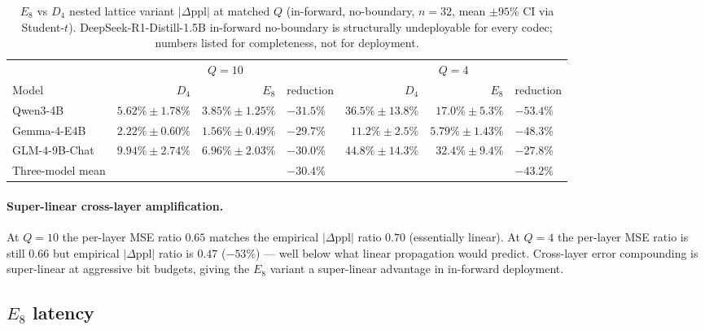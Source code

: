 \documentclass[10pt,a4paper]{article}
\theoremstyle{definition}
\theoremstyle{plain}
\newcommand{\abs}[1]{\left\lvert#1\right\rvert}
\begin{document}
\begin{table}[H]
\centering
\small
\caption{$E_8$ vs $D_4$ nested lattice variant $\abs{\Delta\mathrm{ppl}}$ at matched $Q$ (in-forward,
no-boundary, $n=32$, mean $\pm 95\%$ CI via Student-$t$). DeepSeek-R1-Distill-1.5B
in-forward no-boundary is structurally undeployable for every
codec; numbers listed for completeness, not for deployment.}
\label{tab:v15-dppl}
\begin{tabular}{lrrlrrl}
  \toprule
   & \multicolumn{3}{c}{$Q = 10$} & \multicolumn{3}{c}{$Q = 4$} \\
  \cmidrule(lr){2-4}\cmidrule(lr){5-7}
  Model & $D_4$ & $E_8$ & reduction & $D_4$ & $E_8$ & reduction \\
  \midrule
  Qwen3-4B      & $5.62\%\pm1.78\%$  & $\mathbf{3.85\%\pm1.25\%}$  & $\mathbf{-31.5\%}$ & $36.5\%\pm 13.8\%$  & $\mathbf{17.0\%\pm 5.3\%}$  & $\mathbf{-53.4\%}$ \\
  Gemma-4-E4B   & $2.22\%\pm0.60\%$  & $\mathbf{1.56\%\pm0.49\%}$  & $\mathbf{-29.7\%}$ & $11.2\%\pm 2.5\%$   & $\mathbf{5.79\%\pm 1.43\%}$ & $\mathbf{-48.3\%}$ \\
  GLM-4-9B-Chat & $9.94\%\pm2.74\%$  & $\mathbf{6.96\%\pm2.03\%}$  & $\mathbf{-30.0\%}$ & $44.8\%\pm 14.3\%$  & $\mathbf{32.4\%\pm 9.4\%}$  & $\mathbf{-27.8\%}$ \\
  \midrule
  Three-model mean & & & $-30.4\%$ & & & $-43.2\%$ \\
  \bottomrule
\end{tabular}
\end{table}

\paragraph{Super-linear cross-layer amplification.}
At $Q=10$ the per-layer MSE ratio $0.65$ matches the empirical
$\abs{\Delta\mathrm{ppl}}$ ratio $0.70$ (essentially linear). At
$Q=4$ the per-layer MSE ratio is still $0.66$ but empirical
$\abs{\Delta\mathrm{ppl}}$ ratio is $0.47$ ($-53\%$) --- well
below what linear propagation would predict. Cross-layer error
compounding is super-linear at aggressive bit budgets, giving the
$E_8$ variant a super-linear advantage in in-forward deployment.

\subsection{$E_8$ latency}
\label{sec:results-latency}
\end{document}
